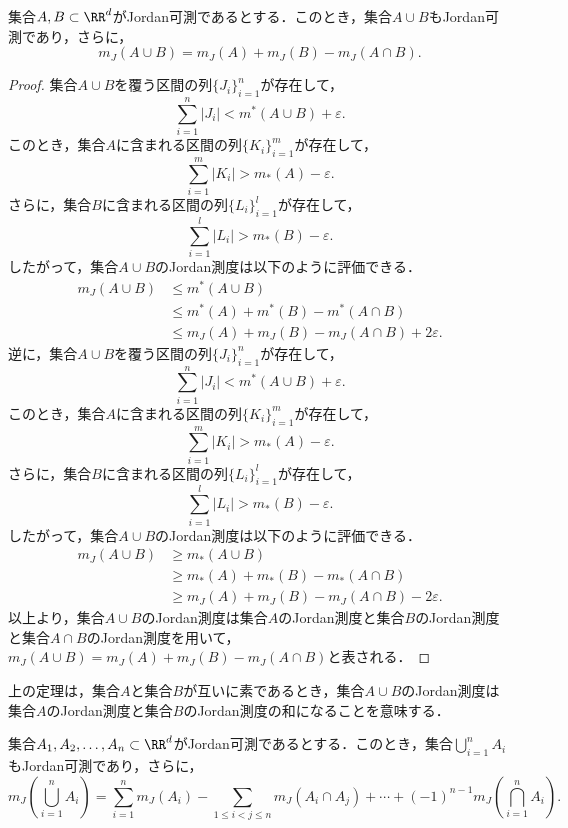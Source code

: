 \begin{theorem}[Jordan測度の有限加法性]
    集合$A, B \subset \RR^d$がJordan可測であるとする．このとき，集合$A \cup B$もJordan可測であり，さらに，
    \[
    m_J(A \cup B) = m_J(A) + m_J(B) - m_J(A \cap B).
    \]
\end{theorem}
\begin{proof}
    集合$A \cup B$を覆う区間の列$\{J_i\}_{i=1}^n$が存在して，
    \[\sum_{i=1}^n |J_i| < m^*(A \cup B) + \varepsilon.\]
    このとき，集合$A$に含まれる区間の列$\{K_i\}_{i=1}^m$が存在して，
    \[\sum_{i=1}^m |K_i| > m_*(A) - \varepsilon.\]
    さらに，集合$B$に含まれる区間の列$\{L_i\}_{i=1}^l$が存在して，
    \[\sum_{i=1}^l |L_i| > m_*(B) - \varepsilon.\]
    したがって，集合$A \cup B$のJordan測度は以下のように評価できる．
    \begin{align*}
        m_J(A \cup B) &\le m^*(A \cup B) \\
        &\le m^*(A) + m^*(B) - m^*(A \cap B) \\
        &\le m_J(A) + m_J(B) - m_J(A \cap B) + 2\varepsilon.
    \end{align*}
    逆に，集合$A \cup B$を覆う区間の列$\{J_i\}_{i=1}^n$が存在して，
    \[\sum_{i=1}^n |J_i| < m^*(A \cup B) + \varepsilon.\]
    このとき，集合$A$に含まれる区間の列$\{K_i\}_{i=1}^m$が存在して，
    \[\sum_{i=1}^m |K_i| > m_*(A) - \varepsilon.\]
    さらに，集合$B$に含まれる区間の列$\{L_i\}_{i=1}^l$が存在して，
    \[\sum_{i=1}^l |L_i| > m_*(B) - \varepsilon.\]
    したがって，集合$A \cup B$のJordan測度は以下のように評価できる．
    \begin{align*}
        m_J(A \cup B) &\ge m_*(A \cup B) \\
        &\ge m_*(A) + m_*(B) - m_*(A \cap B) \\
        &\ge m_J(A) + m_J(B) - m_J(A \cap B) - 2\varepsilon.
    \end{align*}
    以上より，集合$A \cup B$のJordan測度は集合$A$のJordan測度と集合$B$のJordan測度と集合$A \cap B$のJordan測度を用いて，$m_J(A \cup B) = m_J(A) + m_J(B) - m_J(A \cap B)$と表される．
\end{proof}
\begin{remark}
    上の定理は，集合$A$と集合$B$が互いに素であるとき，集合$A \cup B$のJordan測度は集合$A$のJordan測度と集合$B$のJordan測度の和になることを意味する．
\end{remark}
\begin{theorem}[Jordan測度の有限加法性の一般化]
    集合$A_1, A_2, \ldots, A_n \subset \RR^d$がJordan可測であるとする．このとき，集合$\bigcup_{i=1}^n A_i$もJordan可測であり，さらに，
    \[m_J\left( \bigcup_{i=1}^n A_i \right) = \sum_{i=1}^n m_J(A_i) - \sum_{1 \le i < j \le n} m_J(A_i \cap A_j) + \cdots + (-1)^{n-1} m_J\left( \bigcap_{i=1}^n A_i \right).\]
\end{theorem}
